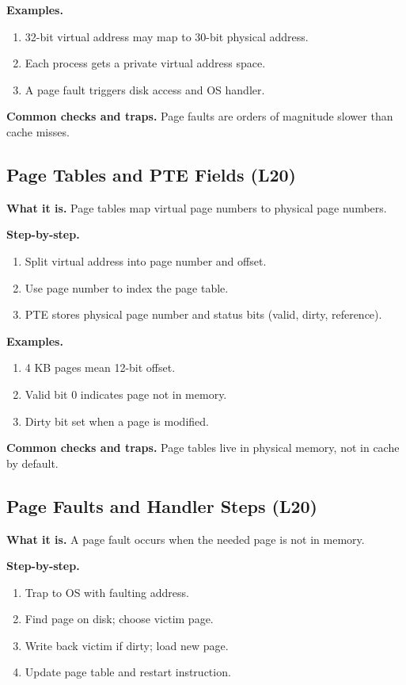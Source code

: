 \documentclass[11pt]{article}
\begin{document}
\textbf{Examples.}
\begin{enumerate}[leftmargin=*]
  \item 32-bit virtual address may map to 30-bit physical address.
  \item Each process gets a private virtual address space.
  \item A page fault triggers disk access and OS handler.
\end{enumerate}

\textbf{Common checks and traps.} Page faults are orders of magnitude slower than cache misses.

\subsection{Page Tables and PTE Fields (L20)}
\textbf{What it is.} Page tables map virtual page numbers to physical page numbers.

\textbf{Step-by-step.}
\begin{enumerate}[leftmargin=*]
  \item Split virtual address into page number and offset.
  \item Use page number to index the page table.
  \item PTE stores physical page number and status bits (valid, dirty, reference).
\end{enumerate}

\textbf{Examples.}
\begin{enumerate}[leftmargin=*]
  \item 4 KB pages mean 12-bit offset.
  \item Valid bit 0 indicates page not in memory.
  \item Dirty bit set when a page is modified.
\end{enumerate}

\textbf{Common checks and traps.} Page tables live in physical memory, not in cache by default.

\subsection{Page Faults and Handler Steps (L20)}
\textbf{What it is.} A page fault occurs when the needed page is not in memory.

\textbf{Step-by-step.}
\begin{enumerate}[leftmargin=*]
  \item Trap to OS with faulting address.
  \item Find page on disk; choose victim page.
  \item Write back victim if dirty; load new page.
  \item Update page table and restart instruction.
\end{enumerate}
\end{document}
